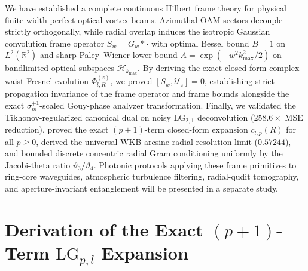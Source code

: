 \documentclass{optica-article}
\begin{document}
We have established a complete continuous Hilbert frame theory for physical finite-width perfect optical vortex beams. Azimuthal OAM sectors decouple strictly orthogonally, while radial overlap induces the isotropic Gaussian convolution frame operator $S_w = G_w * \cdot$ with optimal Bessel bound $B = 1$ on $L^2(\mathbb{R}^2)$ and sharp Paley--Wiener lower bound $A = \exp(-w^2 k_{\max}^2/2)$ on bandlimited optical subspaces $\mathcal{H}_{k_{\max}}$. By deriving the exact closed-form complex-waist Fresnel evolution $\Phi_{l,R}^{(z)}$, we proved $[S_w,\mathcal{U}_z] = 0$, establishing strict propagation invariance of the frame operator and frame bounds alongside the exact $\sigma_m^{+1}$-scaled Gouy-phase analyzer transformation. Finally, we validated the Tikhonov-regularized canonical dual on noisy $\mathrm{LG}_{2,1}$ deconvolution ($258.6\times$ MSE reduction), proved the exact $(p+1)$-term closed-form expansion $c_{l,p}(R)$ for all $p \ge 0$, derived the universal WKB arcsine radial resolution limit ($0.57244$), and bounded discrete concentric radial Gram conditioning uniformly by the Jacobi-theta ratio $\vartheta_3/\vartheta_4$. Photonic protocols applying these frame primitives to ring-core waveguides, atmospheric turbulence filtering, radial-qudit tomography, and aperture-invariant entanglement will be presented in a separate study.

\appendix
\section{Derivation of the Exact $(p+1)$-Term $\mathrm{LG}_{p,l}$ Expansion}
\label{app:lg_derivation}
\end{document}
